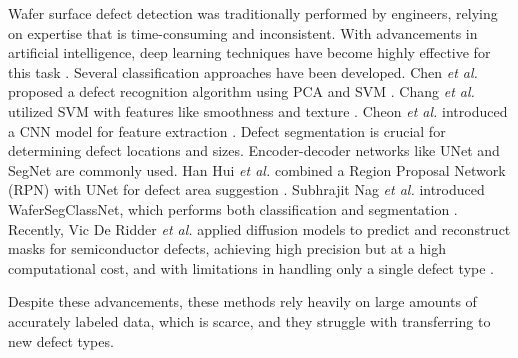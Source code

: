 Wafer surface defect detection was traditionally performed by engineers, relying on expertise that is time-consuming and inconsistent. With advancements in artificial intelligence, deep learning techniques have become highly effective for this task \cite{gao2022review}. Several classification approaches have been developed. Chen \textit{et al.} proposed a defect recognition algorithm using PCA and SVM \cite{chen2008defect}. Chang \textit{et al.} utilized SVM with features like smoothness and texture \cite{chang2013hybrid}. Cheon \textit{et al.} introduced a CNN model for feature extraction \cite{cheon2019convolutional}. Defect segmentation is crucial for determining defect locations and sizes. Encoder-decoder networks like UNet \cite{ronneberger2015u} and SegNet \cite{badrinarayanan2017segnet} are commonly used. Han Hui \textit{et al.} combined a Region Proposal Network (RPN) with UNet for defect area suggestion \cite{han2020polycrystalline}. Subhrajit Nag \textit{et al.} introduced WaferSegClassNet, which performs both classification and segmentation \cite{nag2022wafersegclassnet}. Recently, Vic De Ridder \textit{et al.} applied diffusion models to predict and reconstruct masks for semiconductor defects, achieving high precision but at a high computational cost, and with limitations in handling only a single defect type \cite{de2023semi}.

Despite these advancements, these methods rely heavily on large amounts of accurately labeled data, which is scarce, and they struggle with transferring to new defect types.


